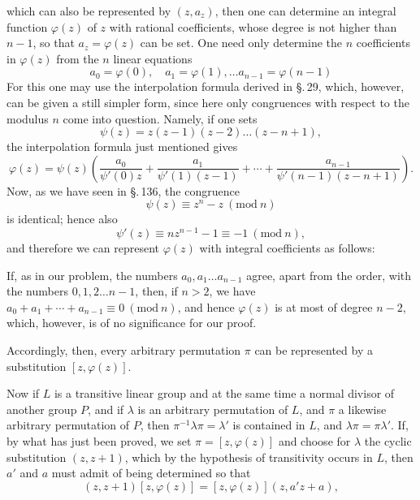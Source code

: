 
which can also be represented by $(z, a_z)$, then one can determine an integral function $\varphi(z)$ of $z$ with rational coefficients, whose degree is not higher than $n - 1$, so that $a_z = \varphi(z)$ can be set. One need only determine the $n$ coefficients in $\varphi(z)$ from the $n$ linear equations
\[
a_0 = \varphi(0), \quad a_1 = \varphi(1), \ldots a_{n-1} = \varphi(n - 1)
\]
For this one may use the  interpolation formula derived in \S.\,29, which, however, can be given a still simpler form, since here only congruences with respect to the modulus $n$ come into question. Namely, if one sets
\[
\psi(z) = z(z - 1)(z - 2) \ldots (z - n + 1),
\]
the interpolation formula just mentioned gives
\[
\varphi(z) = \psi(z)\left(\frac{a_0}{\psi'(0) z} + \frac{a_1}{\psi'(1)(z - 1)} + \cdots + \frac{a_{n-1}}{\psi'(n-1)(z - n + 1)}\right).
\]
Now, as we have seen in \S.\,136, the congruence
\[
\psi(z) \equiv z^n - z\ (\mathrm{mod}\ n)
\]
is identical; hence also
\[
\psi'(z) \equiv n z^{n-1} - 1 \equiv -1\ (\mathrm{mod}\ n),
\]
and therefore we can represent $\varphi(z)$ with integral coefficients as follows:

If, as in our problem, the numbers $a_0, a_1 \ldots a_{n-1}$ agree, apart from the order, with the numbers $0, 1, 2 \ldots n - 1$, then, if $n > 2$, we have $a_0 + a_1 + \cdots + a_{n-1} \equiv 0\ (\mathrm{mod}\ n)$, and hence $\varphi(z)$ is at most of degree $n - 2$, which, however, is of no significance for our proof.

Accordingly, then, every arbitrary permutation $\pi$ can be represented by a substitution $[z, \varphi(z)]$.

Now if $L$ is a transitive linear group and at the same time a normal divisor of another group $P$, and if $\lambda$ is an arbitrary permutation of $L$, and $\pi$ a likewise arbitrary permutation of $P$, then $\pi^{-1}\lambda\pi = \lambda'$ is contained in $L$, and $\lambda\pi = \pi\lambda'$. If, by what has just been proved, we set $\pi = [z, \varphi(z)]$ and choose for $\lambda$ the cyclic substitution $(z, z + 1)$, which by the hypothesis of transitivity occurs in $L$, then $a'$ and $a$ must admit of being determined so that
\[
(z, z + 1)[z, \varphi(z)] = [z, \varphi(z)](z, a'z + a),
\]
